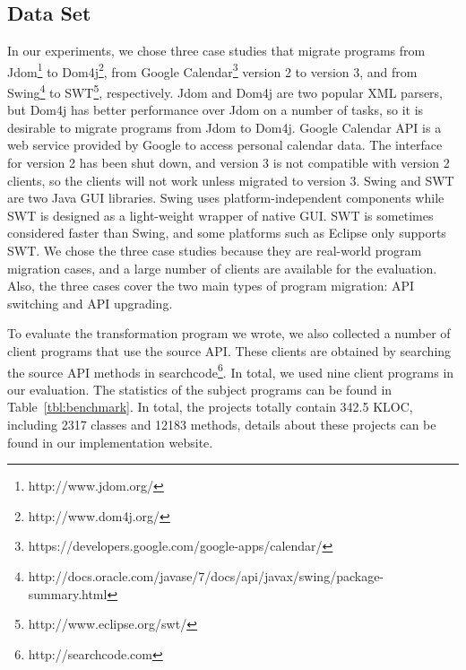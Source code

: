 \documentclass[letterpaper, USenglish]{lipics-v2016}
\theoremstyle{plain}
\begin{document}
\subsection{Data Set}
In our experiments, we chose three case studies that migrate programs
from Jdom\footnote{http://www.jdom.org/} to
Dom4j\footnote{ http://www.dom4j.org/}, from Google
Calendar\footnote{https://developers.google.com/google-apps/calendar/}
version 2 to version 3, and from Swing\footnote{http://docs.oracle.com/javase/7/docs/api/javax/swing/package-summary.html} to SWT\footnote{http://www.eclipse.org/swt/}, respectively. Jdom and Dom4j are two popular XML parsers, but Dom4j has better performance over Jdom on a number of tasks, so it is desirable to migrate programs from Jdom to Dom4j. Google Calendar API
is a web service provided by Google to access personal calendar data.
The interface for version 2 has been shut down, and version 3 is not
compatible with version 2 clients, so the clients will not work unless migrated to version 3. Swing and SWT are two Java GUI
libraries. Swing uses platform-independent components while SWT is
designed as a light-weight wrapper of native GUI. SWT is sometimes
considered faster than Swing, and some platforms such as Eclipse only
supports SWT. We chose the three case studies
because they are real-world program migration cases, and a large
number of clients are available for the evaluation. Also, the three
cases cover the two main types of program migration: API
switching and API upgrading.

To evaluate the transformation program we wrote, we also collected a
number of client programs that use the source API. These clients are
obtained by searching the source API methods in
searchcode\footnote{http://searchcode.com}. In total, we used nine client programs in our evaluation. 
The statistics of the subject programs can be found in
Table~\ref{tbl:benchmark}. In total, the projects totally contain 342.5
KLOC, including 2317 classes and 12183 methods, details about these projects can be found in our implementation website.
\end{document}
